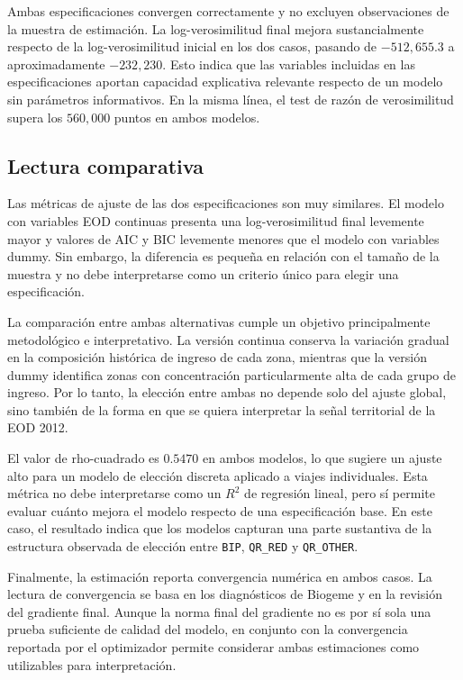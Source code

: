 Ambas especificaciones convergen correctamente y no excluyen observaciones de la muestra de
estimación. La log-verosimilitud final mejora sustancialmente respecto de la log-verosimilitud
inicial en los dos casos, pasando de \(-512{,}655.3\) a aproximadamente \(-232{,}230\). Esto indica
que las variables incluidas en las especificaciones aportan capacidad explicativa relevante respecto
de un modelo sin parámetros informativos. En la misma línea, el test de razón de verosimilitud supera
los \(560{,}000\) puntos en ambos modelos.

\subsection{Lectura comparativa}

Las métricas de ajuste de las dos especificaciones son muy similares. El modelo con variables EOD
continuas presenta una log-verosimilitud final levemente mayor y valores de AIC y BIC levemente
menores que el modelo con variables dummy. Sin embargo, la diferencia es pequeña en relación con el
tamaño de la muestra y no debe interpretarse como un criterio único para elegir una especificación.

La comparación entre ambas alternativas cumple un objetivo principalmente metodológico e
interpretativo. La versión continua conserva la variación gradual en la composición histórica de
ingreso de cada zona, mientras que la versión dummy identifica zonas con concentración
particularmente alta de cada grupo de ingreso. Por lo tanto, la elección entre ambas no depende solo
del ajuste global, sino también de la forma en que se quiera interpretar la señal territorial de la
EOD 2012.

El valor de rho-cuadrado es \(0.5470\) en ambos modelos, lo que sugiere un ajuste alto para un
modelo de elección discreta aplicado a viajes individuales. Esta métrica no debe interpretarse como
un \(R^2\) de regresión lineal, pero sí permite evaluar cuánto mejora el modelo respecto de una
especificación base. En este caso, el resultado indica que los modelos capturan una parte sustantiva
de la estructura observada de elección entre \texttt{BIP}, \texttt{QR\_RED} y
\texttt{QR\_OTHER}.

Finalmente, la estimación reporta convergencia numérica en ambos casos. La lectura de convergencia
se basa en los diagnósticos de Biogeme y en la revisión del gradiente final. Aunque la norma final
del gradiente no es por sí sola una prueba suficiente de calidad del modelo, en conjunto con la
convergencia reportada por el optimizador permite considerar ambas estimaciones como utilizables para
interpretación.
